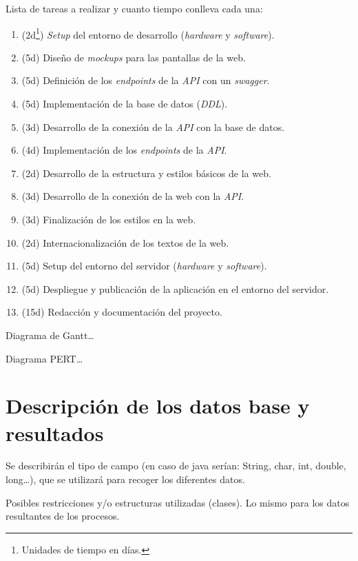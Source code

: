 \documentclass[12pt,a4paper,titlepage]{article}
\begin{document}

    Lista de tareas a realizar y cuanto tiempo conlleva cada una:

    \begin{enumerate}
        \item (2d\footnote{Unidades de tiempo en días.}) \textit{Setup} del entorno de desarrollo (\textit{hardware} y \textit{software}).
        \item (5d) Diseño de \textit{mockups} para las pantallas de la web.
        \item (5d) Definición de los \textit{endpoints} de la \textit{API} con un \textit{swagger}.
        \item (5d) Implementación de la base de datos (\textit{DDL}).
        \item (3d) Desarrollo de la conexión de la \textit{API} con la base de datos.
        \item (4d) Implementación de los \textit{endpoints} de la \textit{API}.
        \item (2d) Desarrollo de la estructura y estilos básicos de la web.
        \item (3d) Desarrollo de la conexión de la web con la \textit{API}.
        \item (3d) Finalización de los estilos en la web.
        \item (2d) Internacionalización de los textos de la web.
        \item (5d) Setup del entorno del servidor (\textit{hardware} y \textit{software}).
        \item (5d) Despliegue y publicación de la aplicación en el entorno del servidor.
        \item (15d) Redacción y documentación del proyecto.
    \end{enumerate}

    Diagrama de Gantt\dots

    Diagrama PERT\dots

    \section{Descripción de los datos base y resultados}

    Se describirán el tipo de campo (en caso de java serían: String, char, int, double, long\dots), que se utilizará para recoger los diferentes datos.

    Posibles restricciones y/o estructuras utilizadas (clases). Lo mismo para los datos resultantes de los procesos.
\end{document}
